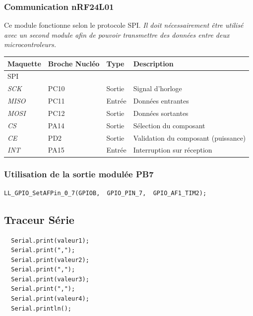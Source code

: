 \documentclass[a4paper,11pt,titlepage]{article} %
\begin{document}
\subsubsection{Communication nRF24L01}

Ce module fonctionne selon le protocole SPI. \textit{Il doit nécessairement être utilisé avec un second module afin de pouvoir transmettre des données entre deux microcontroleurs.}

\begin{center}
\begin{tabular}{|l|l|l|l|}
\hline 
Maquette & \textbf{Broche Nucléo} & Type & Description \\ 
\hline 
\textsc{SPI} & & & \\ 
\textit{SCK} & PC10 & Sortie & Signal d'horloge\\
\textit{MISO} & PC11 & Entrée & Données entrantes\\
\textit{MOSI} & PC12 & Sortie & Données sortantes\\ 
\hline  
\textit{CS} & PA14 & Sortie & Sélection du composant\\ 
\textit{CE} & PD2 & Sortie & Validation du composant (puissance)\\ 
\textit{INT} & PA15 & Entrée & Interruption sur réception\\ 
\hline  
\end{tabular} 
\end{center}


\subsubsection{Utilisation de la sortie modulée PB7}
	
\begin{lstlisting}
LL_GPIO_SetAFPin_0_7(GPIOB,  GPIO_PIN_7,  GPIO_AF1_TIM2);
\end{lstlisting}


\subsection{Traceur Série}

\begin{lstlisting}
  Serial.print(valeur1);
  Serial.print(",");
  Serial.print(valeur2);
  Serial.print(",");
  Serial.print(valeur3);
  Serial.print(",");
  Serial.print(valeur4);
  Serial.println();
\end{lstlisting}


\end{document}
